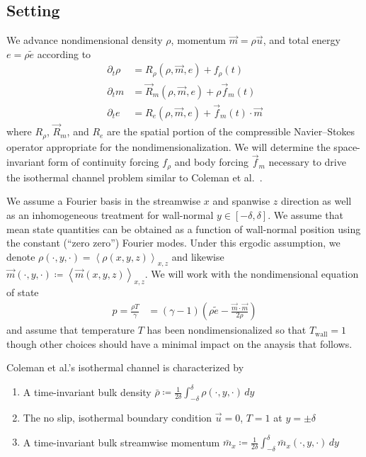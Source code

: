\documentclass[letterpaper,11pt,nointlimits,reqno]{amsart}
\begin{document}
\subsection*{Setting}

We advance nondimensional density $\rho$, momentum $\vec{m}=\rho{}\vec{u}$, and
total energy $e = \rho{}\tilde{e}$ according to
\begin{subequations}
\begin{align}
  \partial_{t} \rho{} &= R_{\rho}\!\left(\rho,\vec{m},e\right)
                       + f_{\rho}(t)
  \\
  \partial_{t} m      &= \vec{R}_{m}\!\left(\rho,\vec{m},e\right)
                       + \rho \vec{f}_{m}(t)
  \\
  \partial_{t} e      &= R_{e}\!\left(\rho,\vec{m},e\right)
                       + \vec{f}_{m}(t) \cdot \vec{m}
\end{align}
\end{subequations}
where $R_{\rho}$, $\vec{R}_{m}$, and $R_{e}$ are the spatial portion of the
compressible Navier--Stokes operator appropriate for the nondimensionalization.
We will determine the space-invariant form of continuity forcing $f_{\rho}$ and
body forcing $\vec{f}_{m}$ necessary to drive the isothermal channel problem
similar to Coleman et al.~\cite{Coleman1995Numerical}.

We assume a Fourier basis in the streamwise $x$ and spanwise $z$ direction as
well as an inhomogeneous treatment for wall-normal
$y\in\left[-\delta,\delta\right]$.  We assume that mean state quantities can be
obtained as a function of wall-normal position using the constant (``zero
zero'') Fourier modes.  Under this ergodic assumption, we denote
$\rho\!\left(\cdot,y,\cdot\right) =
\left<\rho\left(x,y,z\right)\right>_{x,z}$ and likewise
$\vec{m}\!\left(\cdot,y,\cdot\right) \coloneqq
\left<\vec{m}\left(x,y,z\right)\right>_{x,z}$.  We will work with the
nondimensional equation of state
\begin{align}
  p  = \frac{\rho{}T}{\gamma}
    &= \left(\gamma-1\right)
       \left( \rho\tilde{e} - \frac{\vec{m}\cdot\vec{m}}{2\rho} \right)
\end{align}
and assume that temperature $T$ has been nondimensionalized so that
$T_\text{wall}=1$ though other choices should have a minimal impact on
the anaysis that follows.

Coleman et al.'s isothermal channel is characterized by
\begin{enumerate}
  \item A time-invariant bulk density $\bar{\rho} \coloneqq \frac{1}{2\delta}
        \int_{-\delta}^{\delta} \rho\!\left(\cdot,y,\cdot\right)\,dy $
  \item The no slip, isothermal boundary condition
        $\vec{u}=0$, $T = 1$ at $y = \pm\delta$
  \item A time-invariant bulk streamwise momentum
        $\bar{m}_{x} \coloneqq \frac{1}{2\delta}
        \int_{-\delta}^{\delta} \bar{m}_{x}\!\left(\cdot,y,\cdot\right)\,dy $
\end{enumerate}
\end{document}
